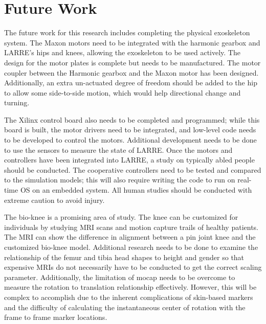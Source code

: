 \section{Future Work}

The future work for this research includes completing the physical exoskeleton system. The Maxon motors need to be integrated with the harmonic gearbox and LARRE's hips and knees, allowing the exoskeleton to be used actively. The design for the motor plates is complete but needs to be manufactured. The motor coupler between the Harmonic gearbox and the Maxon motor has been designed. Additionally, an extra un-actuated degree of freedom should be added to the hip to allow some side-to-side motion, which would help directional change and turning. 

The Xilinx control board also needs to be completed and programmed; while this board is built, the motor drivers need to be integrated, and low-level code needs to be developed to control the motors. Additional development needs to be done to use the sensors to measure the state of LARRE. Once the motors and controllers have been integrated into LARRE, a study on typically abled people should be conducted. The cooperative controllers need to be tested and compared to the simulation models; this will also require writing the code to run on real-time OS on an embedded system. All human studies should be conducted with extreme caution to avoid injury. 

The bio-knee is a promising area of study. The knee can be customized for individuals by studying MRI scans and motion capture trails of healthy patients. The MRI can show the difference in alignment between a pin joint knee and the customized bio-knee model. Additional research needs to be done to examine the relationship of the femur and tibia head shapes to height and gender so that expensive MRIs do not necessarily have to be conducted to get the correct scaling parameter. Additionally, the limitation of mocap needs to be overcome to measure the rotation to translation relationship effectively. However, this will be complex to accomplish due to the inherent complications of skin-based markers and the difficulty of calculating the instantaneous center of rotation with the frame to frame marker locations.  


